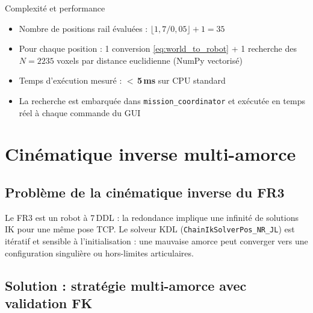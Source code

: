 \documentclass[11pt, a4paper]{article}
\begin{document}
\begin{resultbox}{Complexité et performance}
\begin{itemize}[leftmargin=1em, itemsep=2pt]
  \item Nombre de positions rail évaluées : $\lfloor 1{,}7 / 0{,}05 \rfloor + 1 = 35$
  \item Pour chaque position : 1 conversion \eqref{eq:world_to_robot} + 1 recherche des $N = 2235$ voxels par distance euclidienne (NumPy vectorisé)
  \item Temps d'exécution mesuré : \textbf{$<$\,5\,ms} sur CPU standard
  \item La recherche est embarquée dans \texttt{mission\_coordinator} et exécutée en temps réel à chaque commande du GUI
\end{itemize}
\end{resultbox}

\section{Cinématique inverse multi-amorce}

\subsection{Problème de la cinématique inverse du FR3}

Le FR3 est un robot à 7\,DDL : la redondance implique une infinité de solutions IK pour une même pose TCP. Le solveur KDL (\texttt{ChainIkSolverPos\_NR\_JL}) est itératif et sensible à l'initialisation : une mauvaise amorce peut converger vers une configuration singulière ou hors-limites articulaires.

\subsection{Solution : stratégie multi-amorce avec validation FK}
\end{document}
